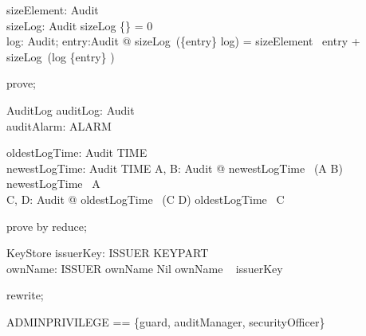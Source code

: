 \begin{axdef}
    sizeElement: Audit \fun \nat \\
    sizeLog: \finset Audit \fun \nat
\where
        sizeLog \{\} = 0 \\

     \forall log: \finset Audit; entry:Audit @
        sizeLog~(\{entry\} \cup log) =
           sizeElement~ entry +
           sizeLog~(log \setminus \{entry\} )
\end{axdef}

\begin{zproof}
prove;
\end{zproof}

\begin{schema}{AuditLog}
  auditLog: \finset  Audit\\
  auditAlarm: ALARM
\end{schema}

\begin{axdef}
  oldestLogTime: \finset  Audit \fun  TIME\\
  newestLogTime: \finset  Audit \fun  TIME
\where
  \forall  A, B: \finset  Audit @ newestLogTime~ (A \cup  B) \geq  newestLogTime~ A
    \\
  \forall C, D: \finset Audit @ oldestLogTime~ (C \cup  D) \leq  oldestLogTime~ C
\end{axdef}

\begin{zproof}
prove by reduce;
\end{zproof}

\begin{schema}{KeyStore}
  issuerKey: ISSUER \pfun  KEYPART\\
  ownName: \Optional ISSUER
\where
  ownName \neq  Nil \implies  \The ownName \in  \dom~  issuerKey
\end{schema}

\begin{zproof}
rewrite;
\end{zproof}

\begin{zed}
ADMINPRIVILEGE == \{guard, auditManager, securityOfficer\}
\end{zed}

